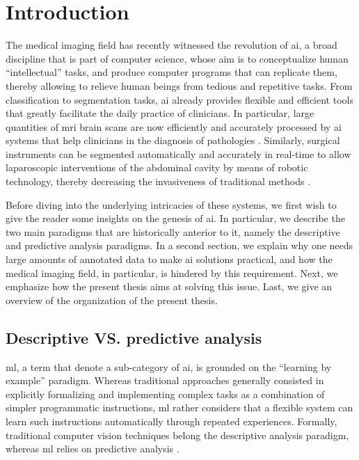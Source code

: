 
\chapter{Introduction}
\label{intro}

The medical imaging field has recently witnessed the revolution of \gls{ai}, a broad discipline that is part of computer science, whose aim is to conceptualize human ``intellectual'' tasks, and produce computer programs that can replicate them, thereby allowing to relieve human beings from tedious and repetitive tasks.
From classification to segmentation tasks, \gls{ai} already provides flexible and efficient tools that greatly facilitate the daily practice of clinicians.
In particular, large quantities of \gls{mri} brain scans are now efficiently and accurately processed by \gls{ai} systems that help clinicians in the diagnosis of pathologies \cite{sun19}.
Similarly, surgical instruments can be segmented automatically and accurately in real-time to allow laparoscopic interventions of the abdominal cavity by means of robotic technology, thereby decreasing the invasiveness of traditional methods \cite{davinci}.

Before diving into the underlying intricacies of these systems, we
first wish to give the reader some insights on the genesis of \gls{ai}.
In particular, we describe the two main paradigms that are historically anterior to it, namely the descriptive and predictive analysis paradigms.
In a second section, we explain why one needs large amounts of annotated data to make \gls{ai} solutions practical, and how the medical imaging field, in particular, is hindered by this requirement.
Next, we emphasize how the present thesis aims at solving this issue.
Last, we give an overview of the organization of the present thesis.

\section{Descriptive VS. predictive analysis}
\Gls{ml}, a term that denote a sub-category of \gls{ai}, is grounded on the ``learning by example'' paradigm.
Whereas traditional approaches generally consisted in explicitly formalizing and implementing complex tasks as a combination of simpler programmatic instructions,
\gls{ml} rather considers that a flexible system can learn such instructions automatically through repeated experiences.
Formally, traditional computer vision techniques belong the descriptive analysis paradigm, whereas \gls{ml} relies on predictive analysis \cite{omahony19}.

